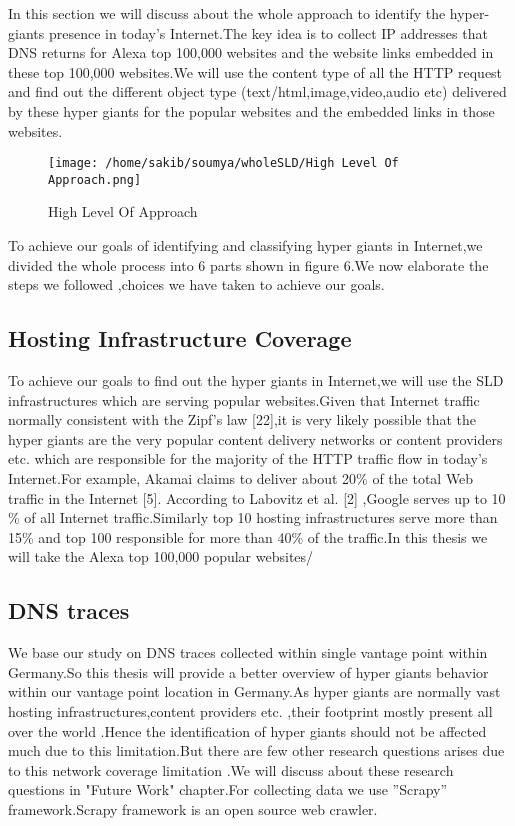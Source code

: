 In this section we will discuss about the whole approach to identify the hyper-
giants presence in today's Internet.The key idea is to collect IP addresses that
DNS returns for Alexa top 100,000 websites and the website links embedded in
these top 100,000 websites.We will use the content type of all the HTTP request
and find out the different object type (text/html,image,video,audio etc) delivered by these hyper giants for the popular websites and the embedded links in
those websites.

\begin{figure}[h]
\texttt{[image: /home/sakib/soumya/wholeSLD/High Level Of Approach.png]}
\centering
\caption{High Level Of Approach}
\end{figure}

To achieve our goals of identifying and classifying hyper giants in Internet,we
divided the whole process into 6 parts shown in figure 6.We now elaborate the
steps we followed ,choices we have taken to achieve our goals.

\subsection{Hosting Infrastructure Coverage}
To achieve our goals to find out the hyper giants in Internet,we will use the SLD infrastructures which are serving popular websites.Given that Internet traffic
normally consistent with the Zipf’s law [22],it is very likely possible that the hyper giants are the very popular content delivery networks or content providers
etc. which are responsible for the majority of the HTTP traffic flow in today's
Internet.For example, Akamai claims to deliver about 20\% of the total Web
traffic in the Internet [5]. According to Labovitz et al. [2] ,Google serves up to
10 \% of all Internet traffic.Similarly top 10 hosting infrastructures serve more
than 15\% and top 100 responsible for more than 40\% of the traffic.In this thesis
we will take the Alexa top 100,000 popular websites/
\subsection{DNS traces}
We base our study on DNS traces collected within single vantage point within
Germany.So this thesis will provide a better overview of hyper giants behavior
within our vantage point location in Germany.As hyper giants are normally vast
hosting infrastructures,content providers etc. ,their footprint mostly present all
over the world .Hence the identification of hyper giants should not be affected
much due to this limitation.But there are few other research questions arises
due to this network coverage limitation .We will discuss about these
research questions in "Future Work" chapter.For collecting data we use ”Scrapy”
framework.Scrapy framework is an open source web crawler.
